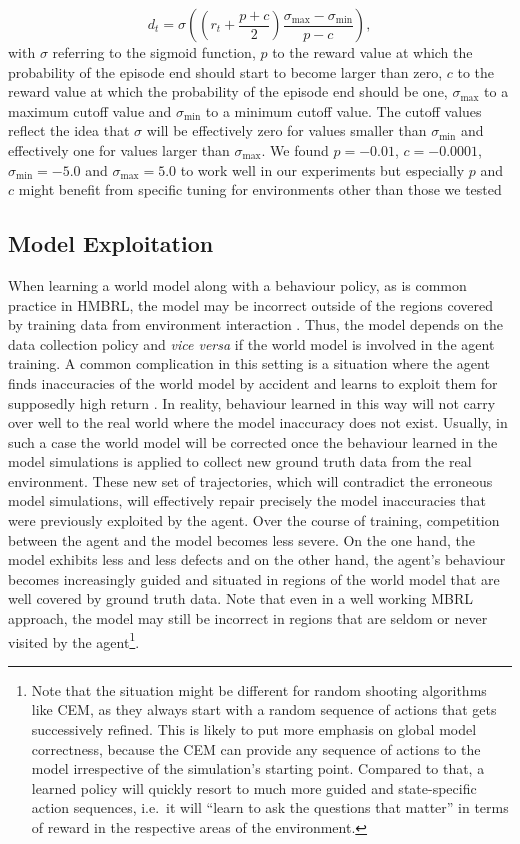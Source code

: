 \documentclass{article}
\begin{document}
\begin{equation}
    d_t = \sigma \left( \left( r_t + \frac{p + c}{2} \right) \frac{\sigma_{\max} - \sigma_{\min}}{p - c} \right),
\end{equation}
with $\sigma$ referring to the sigmoid function, $p$ to the reward value at which the probability of the episode end should start to become larger than zero, $c$ to the reward value at which the probability of the episode end should be one, $\sigma_{\max}$ to a maximum cutoff value and $\sigma_{\min}$ to a minimum cutoff value. The cutoff values reflect the idea that $\sigma$ will be effectively zero for values smaller than $\sigma_{\min}$ and effectively one for values larger than  $\sigma_{\max}$. We found $p = -0.01$, $c = -0.0001$, $\sigma_{\min} = -5.0$ and $\sigma_{\max} = 5.0$ to work well in our experiments but especially $p$ and $c$ might benefit from specific tuning for environments other than those we tested

\subsection{Model Exploitation}\label{sec:model_exploitation}

When learning a world model along with a behaviour policy, as is common practice in HMBRL, the model may be incorrect outside of the regions covered by training data from environment interaction \citep{chua2018deep}. 
Thus, the model depends on the data collection policy and \textit{vice versa} if the world model is involved in the agent training.
A common complication in this setting is a situation where the agent finds inaccuracies of the world model by accident and learns to exploit them for supposedly high return \citep{janner2021trust}. 
In reality, behaviour learned in this way will not carry over well to the real world where the model inaccuracy does not exist. 
Usually, in such a case the world model will be corrected once the behaviour learned in the model simulations is applied to collect new ground truth data from the real environment. 
These new set of trajectories, which will contradict the erroneous model simulations, will effectively repair precisely the model inaccuracies that were previously exploited by the agent. 
Over the course of training, competition between the agent and the model becomes less severe. 
On the one hand, the model exhibits less and less defects and on the other hand, the agent's behaviour becomes increasingly guided and situated in regions of the world model that are well covered by ground truth data. 
Note that even in a well working MBRL approach, the model may still be incorrect in regions that are seldom or never visited by the agent\footnote{Note that the situation might be different for random shooting algorithms like CEM, as they always start with a random sequence of actions that gets successively refined. This is likely to put more emphasis on global model correctness, because the CEM can provide any sequence of actions to the model irrespective of the simulation's starting point. Compared to that, a learned policy will quickly resort to much more guided and state-specific action sequences, i.e.\ it will ``learn to ask the questions that matter'' in terms of reward in the respective areas of the environment.}.
\end{document}
